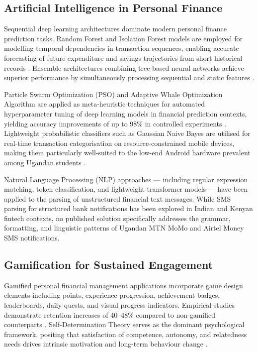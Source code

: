 \documentclass[12pt]{report}
\begin{document}
\subsection{Artificial Intelligence in Personal Finance}

Sequential deep learning architectures dominate modern personal finance prediction
tasks. Random Forest and Isolation Forest models
are employed for modelling temporal dependencies in transaction sequences, enabling
accurate forecasting of future expenditure and savings trajectories from short historical
records \citep{Kumar2024}. Ensemble architectures combining tree-based
neural networks achieve superior performance by simultaneously processing sequential
and static features \citep{VasanthaKumari2025}.

Particle Swarm Optimization (PSO) and Adaptive Whale Optimization Algorithm are
applied as meta-heuristic techniques for automated hyperparameter tuning of deep
learning models in financial prediction contexts, yielding accuracy improvements of up
to 98\% in controlled experiments \citep{Balakrishnan2025,Elhoseny2022}. Lightweight
probabilistic classifiers such as Gaussian Naive Bayes are utilised for real-time
transaction categorisation on resource-constrained mobile devices, making them
particularly well-suited to the low-end Android hardware prevalent among Ugandan
students \citep{VasanthaKumari2025}.

Natural Language Processing (NLP) approaches --- including regular expression
matching, token classification, and lightweight transformer models --- have been
applied to the parsing of unstructured financial text messages. While SMS parsing for
structured bank notifications has been explored in Indian and Kenyan fintech contexts,
no published solution specifically addresses the grammar, formatting, and linguistic
patterns of Ugandan MTN MoMo and Airtel Money SMS notifications.

\subsection{Gamification for Sustained Engagement}

Gamified personal financial management applications incorporate game design elements
including points, experience progression, achievement badges, leaderboards, daily
quests, and visual progress indicators. Empirical studies demonstrate retention
increases of 40--48\% compared to non-gamified counterparts \citep{Bitrian2021}.
Self-Determination Theory serves as the dominant psychological framework, positing
that satisfaction of competence, autonomy, and relatedness needs drives intrinsic
motivation and long-term behaviour change \citep{Uppaluri2025,Khaldi2023}.
\end{document}
